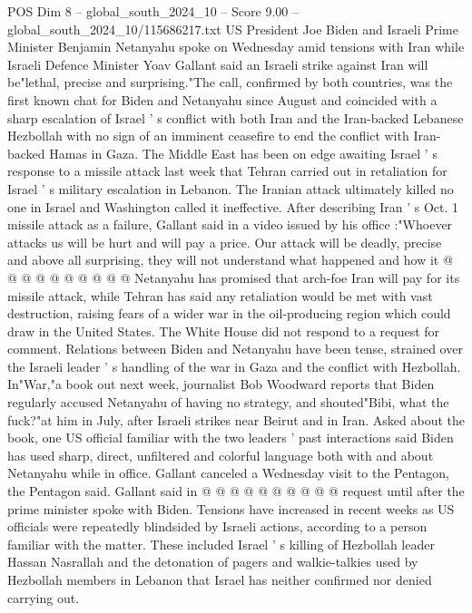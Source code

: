 \begin{textsample}{POS Dim 8 – global\_south\_2024\_10 – Score 9.00 – global\_south\_2024\_10/115686217.txt}  \label{ex:f8_pos_265}
US President Joe Biden and Israeli Prime Minister Benjamin Netanyahu spoke on Wednesday amid tensions with Iran while Israeli Defence Minister Yoav Gallant said an Israeli strike against Iran will be"lethal, precise and surprising."The call, confirmed by both countries, was the first known chat for Biden and Netanyahu since August and coincided with a sharp escalation of Israel ' s conflict with both Iran and the Iran-backed Lebanese Hezbollah with no sign of an imminent ceasefire to end the conflict with Iran-backed Hamas in Gaza.
The Middle East has been on edge awaiting Israel ' s response to a missile attack last week that Tehran carried out in retaliation for Israel ' s military escalation in Lebanon.
The Iranian attack ultimately killed no one in Israel and Washington called it ineffective.
After describing Iran ' s Oct. 1 missile attack as a failure, Gallant said in a video issued by his office :"Whoever attacks us will be hurt and will pay a price.
Our attack will be deadly, precise and above all surprising, they will not understand what happened and how it @ @ @ @ @ @ @ @ @ @ Netanyahu has promised that arch-foe Iran will pay for its missile attack, while Tehran has said any retaliation would be met with vast destruction, raising fears of a wider war in the oil-producing region which could draw in the United States.
The White House did not respond to a request for comment.
Relations between Biden and Netanyahu have been tense, strained over the Israeli leader ' s handling of the war in Gaza and the conflict with Hezbollah.
In"War,"a book out next week, journalist Bob Woodward reports that Biden regularly accused Netanyahu of having no strategy, and shouted"Bibi, what the fuck?"at him in July, after Israeli strikes near Beirut and in Iran.
Asked about the book, one US official familiar with the two leaders ' past interactions said Biden has used sharp, direct, unfiltered and colorful language both with and about Netanyahu while in office.
Gallant canceled a Wednesday visit to the Pentagon, the Pentagon said.
Gallant said in @ @ @ @ @ @ @ @ @ @ request until after the prime minister spoke with Biden.
Tensions have increased in recent weeks as US officials were repeatedly blindsided by Israeli actions, according to a person familiar with the matter.
These included Israel ' s killing of Hezbollah leader Hassan Nasrallah and the detonation of pagers and walkie-talkies used by Hezbollah members in Lebanon that Israel has neither confirmed nor denied carrying out.

\end{textsample}
